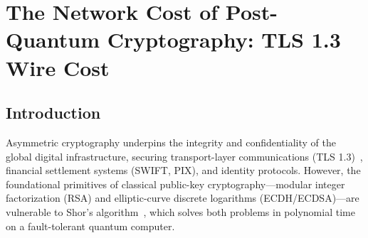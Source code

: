 \chapter{The Network Cost of Post-Quantum Cryptography: TLS 1.3 Wire Cost}
\label{ch:pqc_network_cost}

\begin{abstract}
The advent of quantum computing threatens classical public-key cryptography via Shor's algorithm, prompting the global migration toward Post-Quantum Cryptography (PQC) standardized by NIST in August 2024. While lattice-based cryptography is often assumed to impose severe computational overhead, our empirical benchmarks demonstrate the opposite: key generation in ML-KEM-768 (NIST FIPS 203) executes in just $41.3\,\mu\mathrm{s}$---approximately $740\times$ faster than RSA-2048 ($30.49\,$ms). Instead, the true architectural bottleneck lies in network transport and wire payload expansion. While classical ECDH requires only $65\,$bytes per key share, ML-KEM-768 transmits a $1{,}184$-byte public key and a $1{,}088$-byte ciphertext ($2{,}272\,$B total KEM wire), expanding to $2{,}402\,$B in hybrid deployments (X25519 + ML-KEM-768). Over standard Ethernet with a Maximum Segment Size (MSS) of $1{,}460\,$bytes, a full hybrid \texttt{ClientHello} flight ($1{,}518\,$B) breaches the 1-MSS boundary, mandating TCP segmentation into two distinct packets. Through analytical modeling and deterministic socket transport auditing across exact $1{,}500\,$B Ethernet MTU boundaries and TCP segment fragmentation (Companion Archive DOI: \texttt{10.5281/zenodo.24121695}), we evaluate the impact against RFC 6928 initial congestion windows ($\texttt{initcwnd} = 10$). We demonstrate that while clean networks absorb multi-segment handshakes within the initial flight, lossy links suffer increased head-of-line blocking sensitivity and legacy middlebox inspection buffer drops.
\end{abstract}

\section{Introduction}
Asymmetric cryptography underpins the integrity and confidentiality of the global digital infrastructure, securing transport-layer communications (TLS 1.3)~\cite{rescorla2018}, financial settlement systems (SWIFT, PIX), and identity protocols. However, the foundational primitives of classical public-key cryptography---modular integer factorization (RSA) and elliptic-curve discrete logarithms (ECDH/ECDSA)---are vulnerable to Shor's algorithm~\cite{shor1994}, which solves both problems in polynomial time on a fault-tolerant quantum computer.

